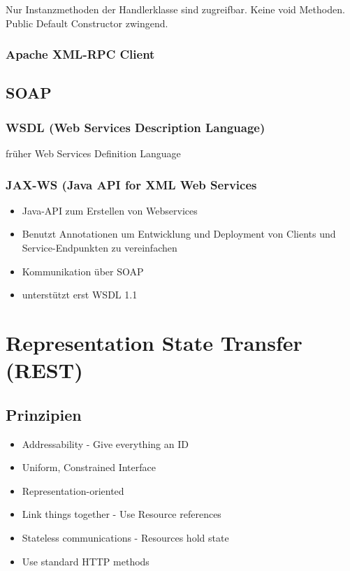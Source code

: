 \documentclass[10pt]{article}
\begin{document}
Nur Instanzmethoden der Handlerklasse sind zugreifbar. Keine void Methoden. Public Default Constructor zwingend.

\subsubsection{Apache XML-RPC Client}



\subsection{SOAP}
\subsubsection{WSDL (Web Services Description Language)}
früher Web Services Definition Language
\subsubsection{JAX-WS (Java API for XML Web Services}
\begin{itemize}
\item Java-API zum Erstellen von Webservices
\item Benutzt Annotationen um Entwicklung und Deployment von Clients und Service-Endpunkten zu vereinfachen
\item Kommunikation über SOAP
\item unterstützt erst WSDL 1.1
\end{itemize}

\newpage
\section{Representation State Transfer (REST)}
\subsection{Prinzipien}
\begin{itemize}
	\item Addressability - Give everything an ID
	\item Uniform, Constrained Interface
	\item Representation-oriented
	\item Link things together - Use Resource references
	\item Stateless communications - Resources hold state
	\item Use standard HTTP methods
\end{itemize}
\end{document}
